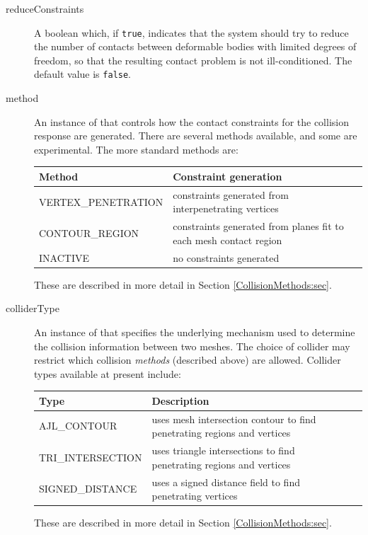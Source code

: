 \begin{description}
\item[reduceConstraints]\mbox{}

A boolean which, if {\tt true}, indicates that the system should try
to reduce the number of contacts between deformable bodies with
limited degrees of freedom, so that the resulting contact problem is
not ill-conditioned.  The default value is {\tt false}.

\item[method]\mbox{}

An instance of
 that
controls how the contact constraints for the collision response are
generated. There are several methods available, and some are
experimental. The more standard methods are:

\begin{tabular}{lll}
\hline
Method & Constraint generation \\
\hline
VERTEX\_PENETRATION & constraints generated from interpenetrating vertices\\
CONTOUR\_REGION & 
constraints generated from planes fit to each mesh contact region \\
INACTIVE & no constraints generated\\
\hline
\end{tabular}

These are described in more detail in 
Section \ref{CollisionMethods:sec}.

\item[colliderType]\mbox{}

An instance of
that specifies the underlying mechanism used to determine the
collision information between two meshes. The choice of collider may
restrict which collision {\it methods} (described above) are
allowed. Collider types available at present include:

\begin{tabular}{lll}
\hline
Type & Description \\
\hline
AJL\_CONTOUR & uses mesh intersection contour to find penetrating 
regions and vertices\\
TRI\_INTERSECTION & uses triangle intersections to find penetrating 
regions and vertices \\
SIGNED\_DISTANCE & uses a signed distance field to find penetrating vertices\\
\hline
\end{tabular}

These are described in more detail in 
Section \ref{CollisionMethods:sec}.

\end{description}

